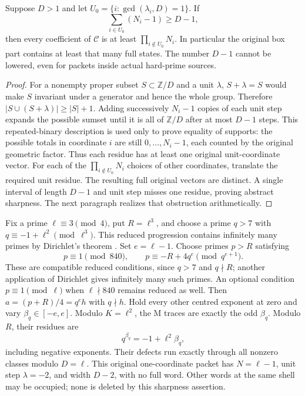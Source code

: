 \begin{theorem}\label{thm:saturation}
Suppose $D>1$ and let $U_0=\{i:\gcd(\lambda_i,D)=1\}$. If
\begin{equation}\label{eq:width}
 \sum_{i\in U_0}(N_i-1)\ge D-1,
\end{equation}
then every coefficient of $\mathcal C$ is at least
$\prod_{i\notin U_0}N_i$. In particular the original box part contains at
least that many full states. The number $D-1$ cannot be lowered, even for
packets inside actual hard-prime sources.
\end{theorem}
\begin{proof}
For a nonempty proper subset $S\subset\mathbb Z/D$ and a unit $\lambda$,
$S+\lambda=S$ would make $S$ invariant under a generator and hence the whole
group. Therefore $|S\cup(S+\lambda)|\ge|S|+1$.
Adding successively $N_i-1$ copies of each unit step expands the possible
sumset until it is all of $\mathbb Z/D$ after at most $D-1$ steps.
This repeated-binary description is used only to prove equality of supports:
the possible totals in coordinate $i$ are still $0,\ldots,N_i-1$, each
counted by the original geometric factor. Thus each residue has at least one
original unit-coordinate vector. For each of the
$\prod_{i\notin U_0}N_i$ choices of other coordinates, translate the required
unit residue. The resulting full original vectors are distinct.
A single interval of length $D-1$ and unit step misses one residue, proving
abstract sharpness. The next paragraph realizes that obstruction arithmetically.
\end{proof}

Fix a prime $\ell\equiv3\pmod4$, put $R=\ell^3$, and choose a prime $q>7$
with $q\equiv-1+\ell^2\pmod{\ell^3}$. This reduced progression contains
infinitely many primes by Dirichlet's theorem \citep[Theorem 18.1]{Dirichlet}.
Set $e=\ell-1$. Choose primes $p>R$ satisfying
\[
 p\equiv1\pmod{840},\qquad
 p\equiv-R+4q^e\pmod{q^{e+1}}.
\]
These are compatible reduced conditions, since $q>7$ and $q\nmid R$; another
application of Dirichlet gives infinitely many such primes. An optional
condition $p\equiv1\pmod\ell$ when $\ell\nmid840$ remains reduced as well.
Then $a=(p+R)/4=q^eh$ with $q\nmid h$. Hold every other centred exponent at
zero and vary $\beta_q\in[-e,e]$. Modulo $K=\ell^2$, the M traces are exactly
the odd $\beta_q$. Modulo $R$, their residues are
\[
 q^{\beta_q}=-1+\ell^2\beta_q,
\]
including negative exponents. Their defects run exactly through all nonzero
classes modulo $D=\ell$. This original one-coordinate packet has $N=\ell-1$, unit step
$\lambda=-2$, and width $D-2$, with no full word. Other words at the
same shell may be occupied; none is deleted by this sharpness assertion.

